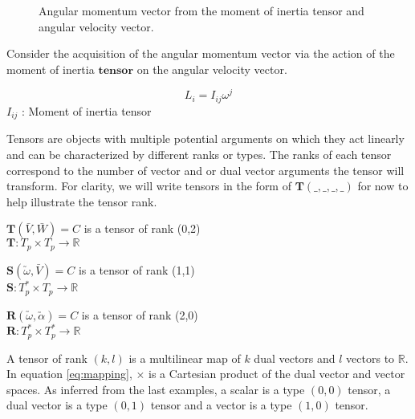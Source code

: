 \documentclass[11pt]{article}
\begin{document}
\begin{figure} [h!]
\begin{centering}
\caption{Angular momentum vector from the moment of inertia tensor and angular velocity vector.}
\label{ang_mo_figure}
		\end{centering}
		\end{figure}

\begin{example} 
Consider the acquisition of the angular momentum vector via the action of the moment of inertia $\boldsymbol{tensor}$ on the angular velocity vector.
		
		\begin{equation}
		L_{i} = I_{ij}\omega^{j}
		\label{eq:angular_momentum}
		\end{equation}
		$I_{ij}$ : Moment of inertia tensor
	\end{example}
	Tensors are objects with multiple potential arguments on which they act linearly and can be characterized by different ranks or types. The ranks of each tensor correspond to the number of vector and or dual vector arguments the tensor will transform. For clarity, we will write tensors in the form of $\boldsymbol{T}(\_,\_,\_,\_)$ for now to help illustrate the tensor rank.
		\begin{example}
		$\boldsymbol{T}(\bar{V},\bar{W}) = C$ is a tensor of rank (0,2)\\
		$\boldsymbol{T}: T_{p} \times T_{p} \to \mathbb{R}$
		\end{example}
		
		\begin{example}
		$\boldsymbol{S}(\utilde{\omega},\bar{V}) = C$ is a tensor of rank (1,1)\\
		$\boldsymbol{S} : T^{*} _{p} \times T_{p} \to \mathbb{R}$
		\end{example}
		
		\begin{example}
		$\boldsymbol{R}(\utilde{\omega},\utilde{\alpha}) = C$ is a tensor of rank (2,0)\\
		$\boldsymbol{R} : T^{*} _{p} \times T^{*} _{p} \to \mathbb{R}$
		\end{example}
		
	A tensor of rank $(k,l)$ is a multilinear map of $k$ dual vectors and $l$ vectors to $\mathbb{R}$. In equation \eqref{eq:mapping}, $\times$ is a Cartesian product of the dual vector and vector spaces. As inferred from the last examples, a scalar is a type $(0,0)$ tensor, a dual vector is a type $(0,1)$ tensor and a vector is a type $(1,0)$ tensor.
	
\end{document}
